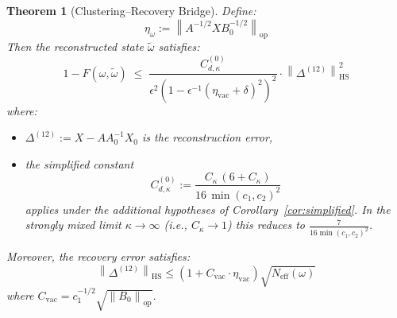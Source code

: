 \documentclass[11pt,a4paper]{article}
\theoremstyle{plain}
\newtheorem{theorem}{Theorem}[section]
\theoremstyle{definition}
\theoremstyle{remark}
\newcommand{\opnorm}[1]{\left\lVert #1 \right\rVert_{\mathrm{op}}}
\newcommand{\hsnorm}[1]{\left\lVert #1 \right\rVert_{\mathrm{HS}}}
\newcommand{\etavac}{\eta_{\mathrm{vac}}}
\newcommand{\Cvac}{C_{\mathrm{vac}}}
\newcommand{\Neff}{N_{\mathrm{eff}}}
\newcommand{\Ckappa}{C_{\kappa}}
\newcommand{\Cd}{C^{(0)}_{d,\kappa}}
\begin{document}
\begin{theorem}[Clustering--Recovery Bridge]
Define:
\begin{equation}
\eta_\omega := \opnorm{A^{-1/2} X B_0^{-1/2}}
\end{equation}
Then the reconstructed state $\tilde{\omega}$ satisfies:
\begin{equation}\label{eq:mainbound}
1 - F(\omega, \tilde{\omega}) \;\le\;
\frac{\Cd}{\epsilon^2\left(1 - \epsilon^{-1}(\etavac + \delta)^2\right)^2}
\cdot \hsnorm{\Delta^{(12)}}^2
\end{equation}
where:
\begin{itemize}
\item $\Delta^{(12)} := X - A A_0^{-1} X_0$ is the \emph{reconstruction error},
\item the simplified constant
\begin{equation}\label{eq:constant}
\Cd := \frac{\Ckappa\,(6 + \Ckappa)}{16\,\min(c_1, c_2)^2}
\end{equation}
applies under the additional hypotheses of Corollary~\ref{cor:simplified}. In the
strongly mixed limit $\kappa \to \infty$ (i.e., $\Ckappa \to 1$) this reduces to
$\frac{7}{16\min(c_1,c_2)^2}$.
\end{itemize}
Moreover, the recovery error satisfies:
\begin{equation}\label{eq:recerror}
\hsnorm{\Delta^{(12)}} \le (1 + \Cvac \cdot \etavac)\sqrt{\Neff(\omega)}
\end{equation}
where $\Cvac = c_1^{-1/2}\sqrt{\opnorm{B_0}}$.
\end{theorem}
\end{document}

